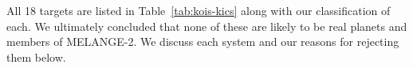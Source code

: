 \documentclass[twocolumn]{aastex631}
\newcommand{\association}{MELANGE-2}
\begin{document}
All 18 targets are listed in Table~\ref{tab:kois-kics} along with our classification of each. We ultimately concluded that none of these are likely to be real planets and members of \association. We discuss each system and our reasons for rejecting them below.







\end{document}
